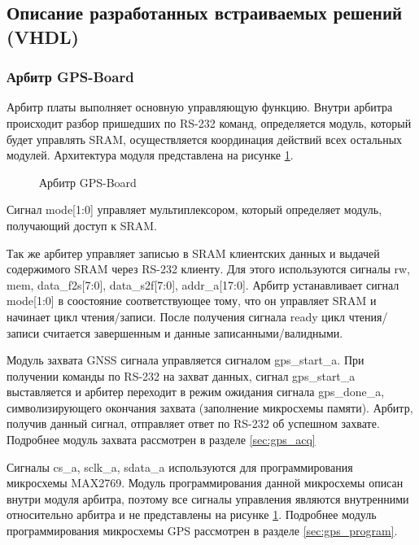 \subsection{Описание разработанных встраиваемых решений (VHDL)}
\subsubsection*{Арбитр GPS-Board}
Арбитр платы выполняет основную управляющую функцию. Внутри арбитра происходит разбор пришедших по RS-232 команд, определяется
модуль, который будет управлять SRAM, осуществляется координация действий всех остальных модулей. Архитектура модуля представлена на
рисунке \ref{pic:arbiter_arch}.

\begin{figure}[h]
\begin{center}
\end{center}
\caption{Арбитр GPS-Board}
\label{pic:arbiter_arch}
\end{figure}

Сигнал mode[1:0] управляет мультиплексором, который определяет модуль, получающий доступ к SRAM. 

Так же арбитер управляет записью в SRAM клиентских данных и выдачей содержимого SRAM через RS-232 клиенту. Для этого используются
сигналы rw, mem, data\_f2s[7:0], data\_s2f[7:0], addr\_a[17:0]. Арбитр устанавливает сигнал mode[1:0] в соостояние соответствующее
тому, что он управляет SRAM и начинает цикл чтения/записи. После получения сигнала ready цикл чтения/записи считается завершенным
и данные записанными/валидными.

Модуль захвата GNSS сигнала управляется сигналом gps\_start\_a.
При получении команды по RS-232 на захват данных, сигнал gps\_start\_a выставляется
и арбитер переходит в режим ожидания сигнала gps\_done\_a, символизирующего окончания захвата (заполнение микросхемы памяти).
Арбитр, получив данный сигнал, отправляет ответ по RS-232 об успешном захвате. Подробнее модуль захвата рассмотрен в разделе
\ref{sec:gps_acq}

Сигналы cs\_a, sclk\_a, sdata\_a используются для программирования микросхемы MAX2769. Модуль программирования данной микросхемы
описан внутри модуля арбитра, поэтому все сигналы управления являются внутренними относительно арбитра и не представлены на рисунке
\ref{pic:arbiter_arch}. Подробнее модуль программирования микросхемы GPS рассмотрен в разделе \ref{sec:gps_program}.

